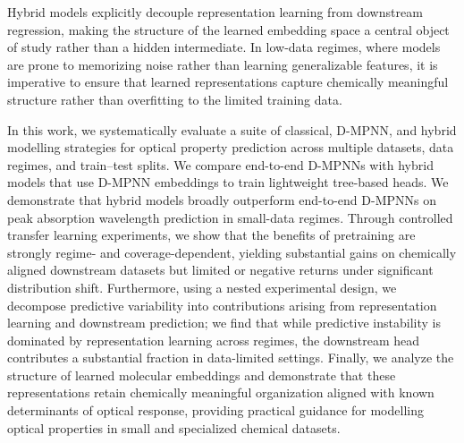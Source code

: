 Hybrid models explicitly decouple representation learning from downstream regression, making the structure of the learned embedding space a central object of study rather than a hidden intermediate. In low-data regimes, where models are prone to memorizing noise rather than learning generalizable features, it is imperative to ensure that learned representations capture chemically meaningful structure rather than overfitting to the limited training data. 

In this work, we systematically evaluate a suite of classical, D-MPNN, and hybrid modelling strategies for optical property prediction across multiple datasets, data regimes, and train–test splits. We compare end-to-end D-MPNNs with hybrid models that use D-MPNN embeddings to train lightweight tree-based heads. We demonstrate that hybrid models broadly outperform end-to-end D-MPNNs on peak absorption wavelength prediction in small-data regimes. Through controlled transfer learning experiments, we show that the benefits of pretraining are strongly regime- and coverage-dependent, yielding substantial gains on chemically aligned downstream datasets but limited or negative returns under significant distribution shift. Furthermore, using a nested experimental design, we decompose predictive variability into contributions arising from representation learning and downstream prediction; we find that while predictive instability is dominated by representation learning across regimes, the downstream head contributes a substantial fraction in data-limited settings. Finally, we analyze the structure of learned molecular embeddings and demonstrate that these representations retain chemically meaningful organization aligned with known determinants of optical response, providing practical guidance for modelling optical properties in small and specialized chemical datasets.

